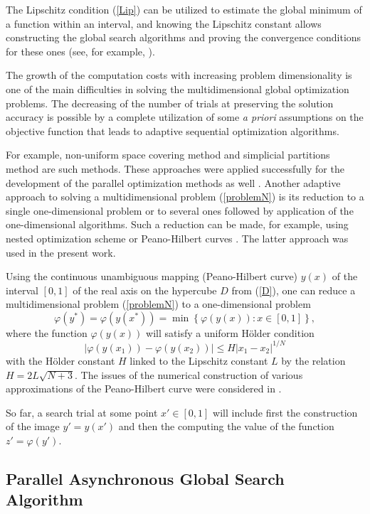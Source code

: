 \documentclass{svproc}
\begin{document}
The Lipschitz condition (\ref{Lip}) can be utilized to estimate the global minimum of a function within an interval, and knowing the Lipschitz constant allows constructing the global search algorithms and proving the convergence conditions for these ones (see, for example, \cite{Strongin2000}).

The growth of the computation costs with increasing problem dimensionality is one of the main difficulties in solving the multidimensional global optimization problems. The decreasing of the number of trials at preserving the solution accuracy is possible by a complete utilization of some {\it a priori} assumptions on the objective function that leads to adaptive sequential optimization algorithms.

For example, non-uniform space covering method \cite{Evtushenko2013} and simplicial partitions method \cite{Zilinskas2010} are such methods. These approaches were applied successfully for the development of the parallel optimization methods as well \cite{Evtushenko2009,Paulavicius2011}. 
Another adaptive approach to solving a multidimensional problem (\ref{problemN}) is its reduction to a single one-dimensional problem or to several ones followed by application of the one-dimensional algorithms. 
Such a reduction can be made, for example, using nested optimization scheme \cite{Grishagin2018} or Peano-Hilbert curves \cite{Barkalov2018}. 
The latter approach was used in the present work.

Using the continuous unambiguous mapping (Peano-Hilbert curve) $y(x)$ of the interval $[0,1]$ of the real axis on the hypercube $D$ from (\ref{D}), one can reduce a multidimensional problem (\ref{problemN}) to a one-dimensional problem
\[
\varphi(y^\ast)=\varphi(y(x^\ast))=\min{\left\{\varphi(y(x)): x\in[0,1]\right\}},
\]
where the function $\varphi(y(x))$ will satisfy a uniform H{\"o}lder condition
\[
\left|\varphi(y(x_1))-\varphi(y(x_2))\right|\leq H\left|x_1-x_2\right|^{1/N}
\]
with the H{\"o}lder constant $H$ linked to the Lipschitz constant $L$ by the relation $ H=2 L \sqrt{N+3}$. 
The issues of the numerical construction of various approximations of the Peano-Hilbert curve were considered in \cite{Strongin2000,Sergeyev2013}.

So far, a search trial at some point $x'\in[0,1]$ will include first the construction of the image $y'=y(x')$ and then the computing the value of the function $z'=\varphi(y')$.

\subsection{Parallel Asynchronous Global Search Algorithm}
\end{document}

